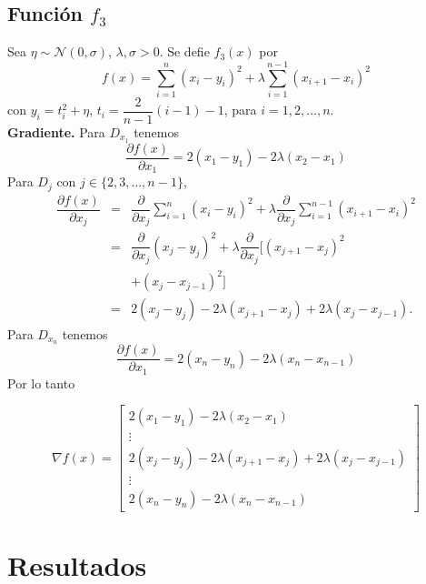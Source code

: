 \documentclass[11pt,letterpaper]{article}
\theoremstyle{definition}
\theoremstyle{definition}
\theoremstyle{definition}
\begin{document}
\subsection{Función $ f_3 $}
Sea $ \eta \sim \mathcal{N} (0, \sigma) $, $\lambda, \sigma > 0 $. Se defie $ f_3(x) $ por
\[ f(x) = \sum_{i = 1}^n (x_i - y_i)^2 + \lambda \sum_{i = 1}^{n-1} (x_{i+1} - x_i)^2 \]
con $ y_i = t_i^2 + \eta $, $ t_i = \dfrac{2}{n-1} (i-1) - 1 $, para $ i = 1, 2, \dots, n $.
\\
\textbf{Gradiente.} Para $ D_{x_1} $ tenemos
\[ 	\dfrac{\partial f(x)}{\partial x_1} = 2 (x_1 - y_1) - 2\lambda (x_2 - x_1) \]
Para $ D_j  $ con $ j \in \{ 2, 3, \dots, n-1 \} $,
\begin{eqnarray*}
	\dfrac{\partial f(x)}{\partial x_j} & = & \dfrac{\partial}{\partial x_j} \sum_{i = 1}^n (x_i - y_i)^2 + \lambda \dfrac{\partial}{\partial x_j} \sum_{i = 1}^{n-1} (x_{i+1} - x_i)^2 \\
										& = & \dfrac{\partial}{\partial x_j} (x_j - y_j)^2 + \lambda \dfrac{\partial}{\partial x_j} [(x_{j+1} - x_j)^2 \\
										&   & + (x_j - x_{j-1})^2] \\
										& = & 2(x_j - y_j) - 2 \lambda (x_{j+1} - x_j) + 2 \lambda (x_j - x_{j-1}).
\end{eqnarray*}
Para $ D_{x_n} $ tenemos
\[ 	\dfrac{\partial f(x)}{\partial x_1} = 2 (x_n - y_n) - 2\lambda (x_n - x_{n-1}) \]
Por lo tanto
\begin{shaded*}
	\footnotesize{\begin{equation*}
		\nabla f(x) = \left[\begin{matrix}
							2(x_1 - y_1) - 2 \lambda (x_2 - x_1) \\
							\vdots \\
							2(x_j - y_j) - 2 \lambda (x_{j+1} - x_j) + 2 \lambda (x_j - x_{j-1}) \\
							\vdots \\
							2 (x_n - y_n) - 2\lambda (x_n - x_{n-1})							
		\end{matrix}\right]
	\end{equation*}}
\end{shaded*}

\section{Resultados}
\end{document}
